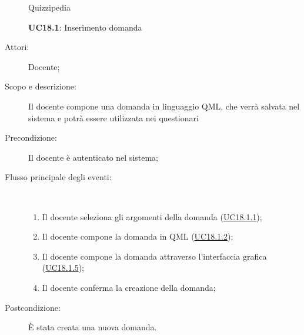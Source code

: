 \begin{figure}[H]
	\centering
	\begin{resizedtikzpicture}{\textwidth}
		\begin{umlsystem}[x=0, fill=lightgray!20]{Quizzipedia}
		\end{umlsystem}
	\end{resizedtikzpicture}
	\caption{\textbf{UC18.1}: Inserimento domanda}
	\label{UC18.1}
\end{figure}
\begin{description}
	\item[Attori:] Docente;
	\item[Scopo e descrizione:] Il docente compone una domanda in linguaggio QML, che verrà salvata nel sistema e potrà essere utilizzata nei questionari
	\item[Precondizione:] Il docente è autenticato nel sistema;
	
	\item[Flusso principale degli eventi:] \ 
	\begin{enumerate}
		\item Il docente seleziona gli argomenti della domanda (\hyperlink{UC18.1.1}{UC18.1.1});
		\item Il docente compone la domanda in QML  (\hyperlink{UC18.1.2}{UC18.1.2});
		\item Il docente compone la domanda attraverso l'interfaccia grafica (\hyperlink{UC18.1.5}{UC18.1.5});
		\item Il docente conferma la creazione della domanda;
		
	\end{enumerate}
	\item[Postcondizione:] È stata creata una nuova domanda.
\end{description}
\hypertarget{UC18.1.1}{}
